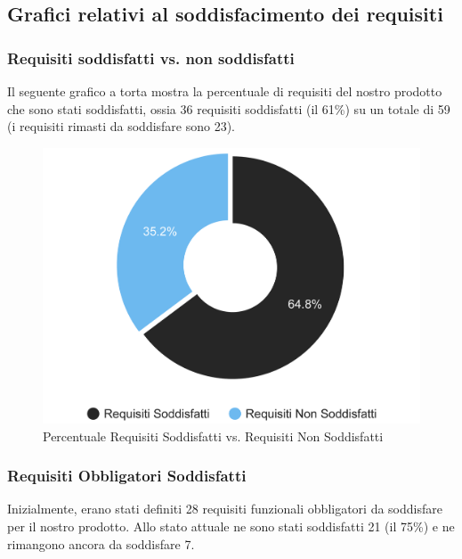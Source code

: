 \newpage

\subsection{Grafici relativi al soddisfacimento dei requisiti}

\subsubsection{Requisiti soddisfatti vs. non soddisfatti}

Il seguente grafico a torta mostra la percentuale di requisiti del nostro prodotto che sono stati soddisfatti, ossia 36 requisiti soddisfatti (il 61\%) su un totale di 59 (i requisiti rimasti da soddisfare sono 23).

\begin{figure}[H]
    \centering
    \includegraphics[scale=0.7]{Contenuto/Immagini/ReqSoddisfatti.png}
    \caption{Percentuale Requisiti Soddisfatti vs. Requisiti Non Soddisfatti}
\end{figure}

\subsubsection{Requisiti Obbligatori Soddisfatti}

Inizialmente, erano stati definiti 28 requisiti funzionali obbligatori da soddisfare per il nostro prodotto. Allo stato attuale ne sono stati soddisfatti 21 (il 75\%) e ne rimangono ancora da soddisfare 7.

